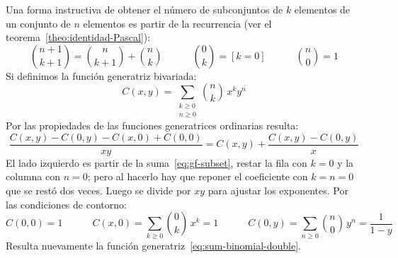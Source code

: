   Una forma instructiva
  de obtener el número de subconjuntos de \(k\) elementos%
  de un conjunto de \(n\) elementos
  es partir de la recurrencia
  (ver el teorema~\ref{theo:identidad-Pascal}):
  \begin{equation}
    \label{eq:recurrence-subset}
    \binom{n + 1}{k + 1}
      = \binom{n}{k + 1} + \binom{n}{k}
    \hspace{3em} \binom{0}{k} = [k = 0]
    \hspace{3em} \binom{n}{0} = 1
  \end{equation}
  Si definimos la función generatriz bivariada:%
  \begin{equation}
    \label{eq:gf-subset}
    C(x, y)
      = \sum_{\substack{k \ge 0 \\ n \ge 0}}
	  \binom{n}{k} \, x^k y^n
  \end{equation}
  Por las propiedades
  de las funciones generatrices ordinarias resulta:
  \begin{equation}
    \label{eq:fe-subsets}
    \frac{C(x, y) - C(0, y) - C(x, 0) + C(0, 0)}{x y}
      = C(x, y) + \frac{C(x, y) - C(0, y)}{x}
  \end{equation}
  El lado izquierdo es partir de la suma~\eqref{eq:gf-subset},
  restar la fila con \(k = 0\)
  y la columna con \(n = 0\);
  pero al hacerlo hay que reponer el coeficiente con \(k = n = 0\)
  que se restó dos veces.
  Luego se divide por \(x y\) para ajustar los exponentes.%
  Por las condiciones de contorno:
  \begin{equation}
    \label{eq:binomial-boundary-gf}
    C(0, 0)
      = 1
    \hspace{3em}
    C(x, 0)
      = \sum_{k \ge 0} \binom{0}{k} \, x^k
      = 1
    \hspace{3em}
    C(0, y)
      = \sum_{n \ge 0} \binom{n}{0} \, y^n
      = \frac{1}{1 - y}
  \end{equation}
  Resulta nuevamente
  la función generatriz~\eqref{eq:sum-binomial-double}.

